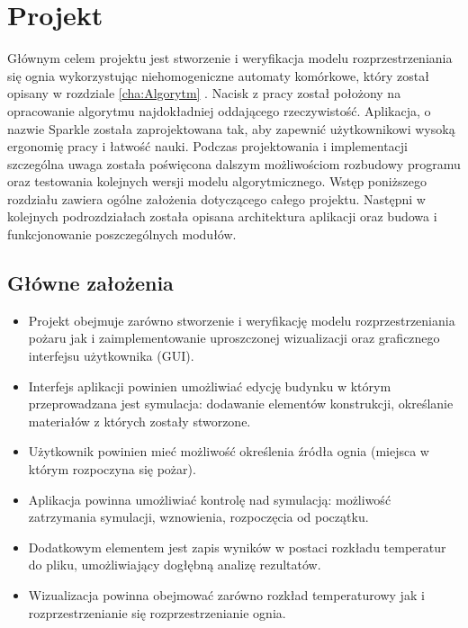 \chapter {Projekt}
Głównym celem projektu jest stworzenie i weryfikacja modelu rozprzestrzeniania się ognia wykorzystując niehomogeniczne automaty
komórkowe, który został opisany w rozdziale \ref{cha:Algorytm} . Nacisk z pracy został położony na opracowanie algorytmu najdokładniej oddającego rzeczywistość.
Aplikacja, o nazwie Sparkle została zaprojektowana tak, aby zapewnić użytkownikowi wysoką ergonomię pracy i łatwość nauki.
Podczas projektowania i implementacji szczególna uwaga została poświęcona dalszym możliwościom rozbudowy programu oraz testowania 
kolejnych wersji modelu algorytmicznego. Wstęp poniższego rozdziału zawiera ogólne założenia dotyczącego całego projektu. 
Następni w kolejnych podrozdziałach została opisana architektura aplikacji oraz budowa i funkcjonowanie poszczególnych modułów.
\label{cha:projekt}
\section {Główne założenia}
\begin {itemize}
\item Projekt obejmuje zarówno stworzenie i weryfikację modelu rozprzestrzeniania pożaru jak i zaimplementowanie uproszczonej wizualizacji oraz graficznego interfejsu użytkownika (GUI).
\item Interfejs aplikacji powinien umożliwiać edycję budynku w którym przeprowadzana jest symulacja: dodawanie elementów konstrukcji, 
określanie materiałów z których zostały stworzone. 
\item Użytkownik powinien mieć możliwość określenia źródła ognia (miejsca w którym rozpoczyna się pożar).
\item Aplikacja powinna umożliwiać kontrolę nad symulacją: możliwość zatrzymania symulacji, wznowienia, rozpoczęcia od początku.
\item Dodatkowym elementem jest zapis wyników w postaci rozkładu temperatur do pliku, umożliwiający dogłębną analizę rezultatów.
\item Wizualizacja powinna obejmować zarówno rozkład temperaturowy jak i rozprzestrzenianie się rozprzestrzenianie ognia. 
\end {itemize}
